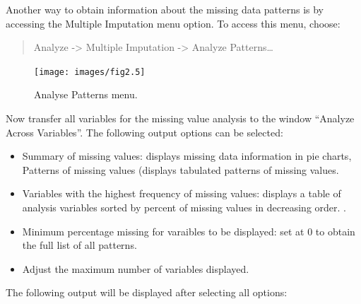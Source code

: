 \documentclass[
]{book}
\providecommand{\tightlist}{%
  \setlength{\itemsep}{0pt}\setlength{\parskip}{0pt}}
\begin{document}
Another way to obtain information about the missing data patterns is by accessing the Multiple Imputation menu option. To access this menu, choose:

\begin{quote}
Analyze -\textgreater{} Multiple Imputation -\textgreater{} Analyze Patterns\ldots{}
\end{quote}

\begin{figure}

{\centering \texttt{[image: images/fig2.5]} 

}

\caption{Analyse Patterns menu.}\label{fig:fig2-5}
\end{figure}

Now transfer all variables for the missing value analysis to the window ``Analyze Across Variables''. The following output options can be selected:

\begin{itemize}
\tightlist
\item
  Summary of missing values: displays missing data information in pie charts, Patterns of missing values (displays tabulated patterns of missing values.
\item
  Variables with the highest frequency of missing values: displays a table of analysis variables sorted by percent of missing values in decreasing order. .
\item
  Minimum percentage missing for varaibles to be displayed: set at 0 to obtain the full list of all patterns.
\item
  Adjust the maximum number of variables displayed.
\end{itemize}

The following output will be displayed after selecting all options:
\end{document}
